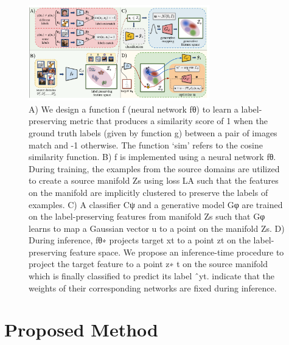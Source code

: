\documentclass[review]{cvpr}
\begin{document}
\begin{figure}[t]
    \centering
    \includegraphics[width=0.7\textwidth]{fig1.png}
    \caption{A) We design a function f (neural network fθ) to learn a label-preserving metric that produces a similarity score
of 1 when the ground truth labels (given by function g) between a pair of images match and -1 otherwise. The function
‘sim’ refers to the cosine similarity function. B) f is implemented using a neural network fθ. During training, the examples
from the source domains are utilized to create a source manifold Zs using loss LA such that the features on the manifold
are implicitly clustered to preserve the labels of examples. C) A classifier Cψ and a generative model Gφ are trained on the
label-preserving features from manifold Zs such that Gφ learns to map a Gaussian vector u to a point on the manifold Zs.
D) During inference, fθ∗ projects target xt to a point zt on the label-preserving feature space. We propose an inference-time
procedure to project the target feature to a point z∗ t on the source manifold which is finally classified to predict its label ˆyt. indicate that the weights of their corresponding networks are fixed during inference.}
    \label{fig:fig1}
\end{figure}

\section{Proposed Method}
\end{document}
